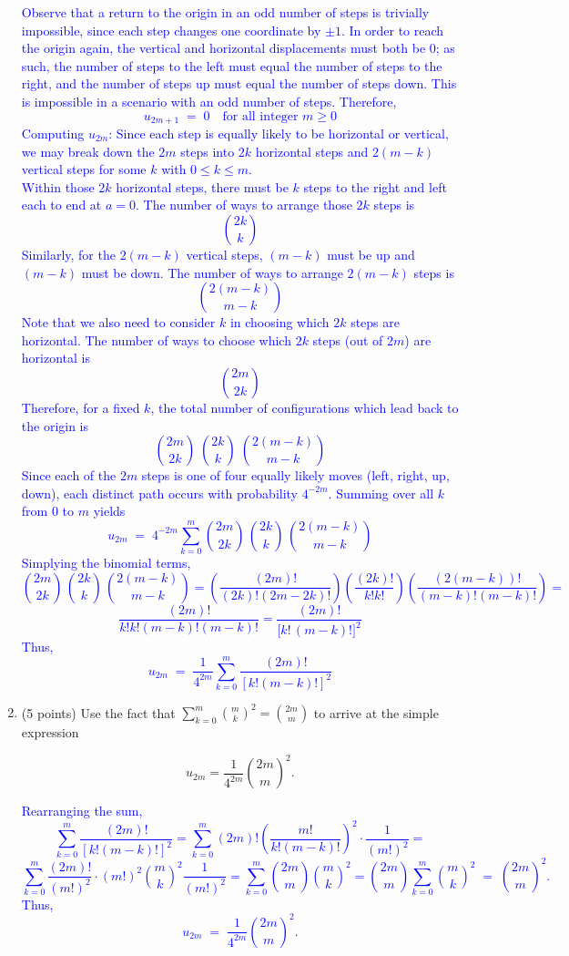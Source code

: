 \documentclass{article}
\begin{document}
\begin{enumerate}[label=(\alph*)]
\textcolor{blue}{
   Observe that a return to the origin in an odd number of steps is trivially impossible, since each step changes one coordinate by $\pm 1$. In order to reach the origin again, the vertical and horizontal displacements must both be 0; as such, the number of steps to the left must equal the number of steps to the right, and the number of steps up must equal the number of steps down. This is impossible in a scenario with an odd number of steps. Therefore,
\[
u_{2m+1} \;=\; 0 
\quad
\text{for all integer } m \ge 0
\]
Computing $u_{2m}$: Since each step is equally likely to be horizontal or vertical, we may break down the $2m$ steps into $2k$ horizontal steps and $2(m-k)$ vertical steps
for some $k$ with $0 \le k \le m$. \\
Within those $2k$ horizontal steps, there must be $k$ steps to the right and left each to end at $a=0$. The number of ways to arrange those $2k$ steps is 
\[
\binom{2k}{k}
\]
Similarly, for the $2(m-k)$ vertical steps, $(m-k)$ must be up and $(m-k)$ must be down. The number of ways to arrange $2(m-k)$ steps is 
\[
\binom{2(m-k)}{m-k}
\]
Note that we also need to consider $k$ in choosing which $2k$ steps are horizontal. The number of ways to choose which $2k$ steps (out of $2m$) are horizontal is 
\[
\binom{2m}{2k}
\]
Therefore, for a fixed $k$, the total number of configurations which lead back to the origin is
\[
\binom{2m}{2k} \; \binom{2k}{k} \; \binom{2(m-k)}{m-k}
\]
Since each of the $2m$ steps is one of four equally likely moves (left, right, up, down), each distinct path occurs with probability $4^{-2m}$. Summing over all $k$ from $0$ to $m$ yields
\[
u_{2m}
\;=\;
4^{-2m}
\sum_{k=0}^{m}
\binom{2m}{2k}\,\binom{2k}{k}\,\binom{2(m-k)}{m-k}
\]
Simplying the binomial terms,
$$\binom{2m}{2k}\,\binom{2k}{k}\,\binom{2(m-k)}{m-k}=\left( \frac{(2m)!}{(2k)!(2m-2k)!}\right) \left(\frac{(2k)!}{k!k!} \right) \left( \frac{(2(m-k))!}{(m-k)!(m-k)!}\right)=$$
$$\frac{(2m)!}{k!k!(m-k)!(m-k)!}=\frac{(2m)!}{\bigl[k! \,(m-k)!\bigr]^2}
$$
Thus,
\[
u_{2m}
\;=\;
\frac{1}{4^{2m}}
\sum_{k=0}^{m}
\frac{(2m)!}{[k!(m-k)!]^2}
\]
}

\item (5 points) Use the fact that 
$\sum_{k=0}^{m} \binom{m}{k}^2 = \binom{2m}{m}$
to arrive at the simple expression

\[
u_{2m} = \frac{1}{4^{2m}} \binom{2m}{m}^2.
\]

\textcolor{blue}{
   Rearranging the sum,
$$
\sum_{k=0}^{m} \frac{(2m)!}{[k!(m-k)!]^2}
= 
\sum_{k=0}^{m} (2m)! \left(\frac{m!}{k!(m-k)!}\right)^2 \cdot \frac{1}{(m!)^2}=$$
$$
\sum_{k=0}^{m} \frac{(2m)!}{(m!)^2} \cdot (m!)^2 \binom{m}{k}^2 
\frac{1}{(m!)^2}= \sum_{k=0}^{m} \binom{2m}{m} \binom{m}{k}^2=\binom{2m}{m} \sum_{k=0}^{m} \binom{m}{k}^2
\;=\;
\binom{2m}{m}^2.
$$
Thus,
\[
u_{2m} 
\;=\;
\frac{1}{4^{2m}} \binom{2m}{m}^2.
\]}



\end{enumerate}
\end{document}

